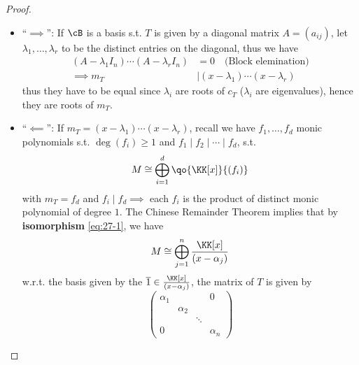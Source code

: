 \begin{proof}
	\leavevmode
	\begin{itemize}
		\item ``\( \implies \)'': If \( \cB \) is a basis s.t. \( T \) is given by a diagonal matrix \(
		      A = (a_{ij})\), let \( \lambda_1,\ldots, \lambda_r \) to be the distinct entries on the
		      diagonal, thus we have
		      \[
			      \begin{aligned}
				      (A - \lambda_1 I_n) \cdots (A - \lambda_r I_n) & = 0 \quad \text{(Block elemination)}
				      \\
				      \implies m_T                                   & \mid (x - \lambda_1) \cdots (x-\lambda_r)
			      \end{aligned}
		      \]
		      thus they have to be equal since \( \lambda_i \) are roots of \( c_T \) (\( \lambda_i \)
		      are eigenvalues), hence they are roots of \( m_T \).
		\item ``\( \impliedby \)'': If \( m_T = (x-\lambda_1)\cdots (x-\lambda_r) \), recall we have
		      \( f_1,\ldots,f_d \) monic polynomials s.t. \( \deg(f_i) \geq 1 \) and \( f_1\mid f_2\mid
		      \cdots \mid f_d\), s.t.
		      \begin{equation}
			      \label{eq:27-1}
			      M \cong \bigoplus_{i=1}^d \qo{\KK[x]}{(f_i)}
		      \end{equation}
		      with \( m_T = f_d \) and \( f_i \mid f_d \implies  \) each \( f_i \) is the product of
		      distinct monic polynomial of degree \( 1 \). The Chinese Remainder Theorem implies that by
		      \textbf{isomorphism} \ref{eq:27-1}, we have
		      \[
			      M \cong \bigoplus_{j=1}^n \frac{\KK[x]}{(x-\alpha_j)}
		      \]
		      w.r.t. the basis given by the \( \overline{1} \in \frac{\KK[x]}{(x-\alpha_j)}\), the
		      matrix of \( T \) is given by
		      \[
			      \begin{pmatrix}
				      \alpha_1 &          &        & 0        \\
				               & \alpha_2 &        &          \\
				               &          & \ddots &          \\
				      0        &          &        & \alpha_n
			      \end{pmatrix}
		      \]
	\end{itemize}
\end{proof}

